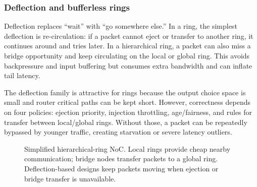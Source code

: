 \documentclass[11pt]{article}
\begin{document}
\subsubsection{Deflection and bufferless rings}

Deflection replaces ``wait'' with ``go somewhere else.'' In a ring, the simplest deflection is re-circulation: if a packet cannot eject or transfer to another ring, it continues around and tries later. In a hierarchical ring, a packet can also miss a bridge opportunity and keep circulating on the local or global ring. This avoids backpressure and input buffering but consumes extra bandwidth and can inflate tail latency.

The deflection family is attractive for rings because the output choice space is small and router critical paths can be kept short. However, correctness depends on four policies: ejection priority, injection throttling, age/fairness, and rules for transfer between local/global rings. Without those, a packet can be repeatedly bypassed by younger traffic, creating starvation or severe latency outliers.

\begin{figure}[t]
\centering
{}
\caption{Simplified hierarchical-ring NoC. Local rings provide cheap nearby communication; bridge nodes transfer packets to a global ring. Deflection-based designs keep packets moving when ejection or bridge transfer is unavailable.}
\label{fig:hird}
\end{figure}
\end{document}
